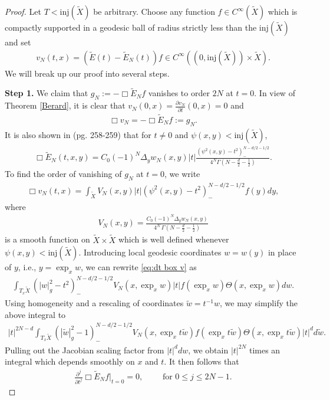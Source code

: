 \documentclass[11pt,letterpaper,oneside]{amsart}
\newcommand{\inj}{\text{inj}}
\theoremstyle{definition}
\theoremstyle{remark}
\newcommand{\wt}{\widetilde}
\renewcommand{\d}{\partial}
\theoremstyle{definition}
\theoremstyle{remark}
\begin{document}
\begin{proof}
    Let $T < \inj (\wt X)$ be arbitrary. Choose any function $f \in C^\infty(\wt X)$ which is compactly supported in a geodesic ball of radius strictly less than the $\inj (\wt X)$ and set
    \begin{align*}
        v_N(t,x) = (\wt E(t) - \wt E_N(t)) f \in C^\infty((0, \inj(\wt X) ) \times \wt X).
    \end{align*}
    We will break up our proof into several steps.
    
    \medskip
    
    \noindent \textbf{Step 1.} We claim that $g_N:= - \Box \wt E_N f$ vanishes to order $2N$ at $t = 0$. In view of Theorem \ref{Berard}, it is clear that $v_N(0,x) = \frac{\d v_N}{\d t}(0,x) = 0$ and
    \begin{align*}
        \Box v_N = - \Box \wt E_N f := g_N.
    \end{align*}
    It is also shown in \cite{Berard77} (pg. 258-259) that for $t \neq 0$ and $\psi(x,y) < \inj(\wt X)$, 
    \begin{align}
        \Box {\wt E}_{N} (t,x,y) = C_0 (-1)^N \Delta_y w_{N} (x,y)|t|
        \frac{\left( \psi^2(x,y) - t^2 \right)_{-}^{N - d/2 - 1/2}}
        {4^N \Gamma \left( N - \tfrac{d}{2} - \frac{1}{2} \right)}.
        \label{eq: Box EN}
    \end{align}
    To find the order of vanishing of $g_N$ at $t=0$, we write
    \begin{align}
     \label{eq:dt box v}
        \Box v_N(t,x) = \int_{\wt X} V_N(x,y) |t| (\psi^2(x,y) - t^2)_{-}^{N - d/2 - 1/2} f(y) dy,
    \end{align}
    where
    \begin{align*}
        V_N(x,y) =
        \frac{C_0 (-1)^N \Delta_y w_{N} (x,y)}
        {4^N \, \Gamma\!\left( N - \tfrac{d}{2} - \tfrac{1}{2} \right)}
    \end{align*}
    is a smooth function on $\wt X \times \wt X$ which is well defined whenever $\psi(x,y) < \inj( \wt X)$. Introducing local geodesic coordinates $w = w(y)$ in place of $y$, i.e., $y = \exp_x w$, we can rewrite \eqref{eq:dt box v} as
    \begin{align*}
        \int_{T_x \wt X} (|w|_g^2 - t^2)_-^{N - d/2 - 1/2} V_N(x, \exp_x w) |t| f(\exp_x w) \Theta (x, \exp_x w) dw.
    \end{align*}
    Using homogeneity and a rescaling of coordinates $\wt w = t^{-1} w$, we may simplify the above integral to
    \begin{align*}
        |t|^{2N - d} \int_{T_x \wt X} (|\wt w|_{g}^2 - 1)_-^{N - d/2 - 1/2} V_N(x, \exp_x t \wt w) f(\exp_x t \wt w) \Theta (x, \exp_x t \wt w) |t|^d d \wt w.
    \end{align*}
    Pulling out the Jacobian scaling factor from $|t|^d dw$, we obtain $|t|^{2N}$ times an integral which depends smoothly on $x$ and $t$. It then follows that
    \begin{align*}
        \frac{\d^j}{\d t^j} \Box \wt E_N f \Big|_{t = 0} = 0, \qquad \text{ for }0 \leq j \leq 2N - 1.
    \end{align*}
    

\end{proof}
\end{document}
